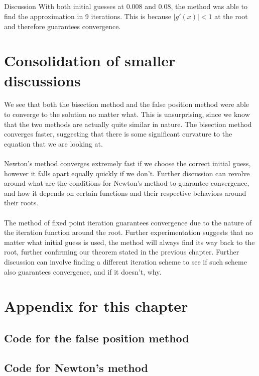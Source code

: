 \documentclass[openany]{book}
\begin{document}
    \subsection{}{Discussion}
    With both initial guesses at 0.008 and 0.08, the method was able to find the approximation in 9 iterations. This is because ${|g'(x)| < 1}$ at the root and therefore guarantees convergence.
    \section{Consolidation of smaller discussions}
    We see that both the bisection method and the false position method were able to converge to the solution no matter what. This is unsurprising, since we know that the two methods are actually quite similar in nature. The bisection method converges faster, suggesting that there is some significant curvature to the equation that we are looking at.\\\\
    Newton's method converges extremely fast if we choose the correct initial guess, however it falls apart equally quickly if we don't. Further discussion can revolve around what are the conditions for Newton's method to guarantee convergence, and how it depends on certain functions and their respective behaviors around their roots.\\\\
    The method of fixed point iteration guarantees convergence due to the nature of the iteration function around the root. Further experimentation suggests that no matter what initial guess is used, the method will always find its way back to the root, further confirming our theorem stated in the previous chapter. Further discussion can involve finding a different iteration scheme to see if such scheme also guarantees convergence, and if it doesn't, why.
    
    \section{Appendix for this chapter}
    \subsection{Code for the false position method}
	
    \subsection{Code for Newton's method}
	
\end{document}
